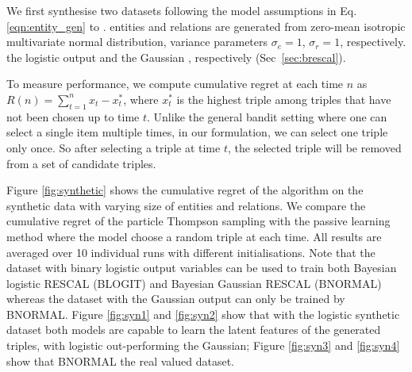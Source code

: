 We first synthesise two datasets 
following the model assumptions in Eq. \ref{eqn:entity_gen} to 
\verify{\ref{eqn:triple_gen}}. 
entities and relations are generated from zero-mean isotropic multivariate normal distribution,  
variance parameters $\sigma_e=1$, $\sigma_r=1$, respectively.
 the logistic output and the Gaussian , respectively (Sec~\ref{sec:brescal}). 

To measure performance, we compute cumulative regret 
at each time $n$ as $R(n) = \sum_{t=1}^{n} x_t - x^{*}_t$, 
where $x^*_t$ is the highest triple among triples that have not been chosen up to time $t$. Unlike the general 
bandit setting where one can select a single item multiple times, in our formulation, we can select one triple 
only once. So after selecting a triple at time $t$, the selected triple will be removed from a set of candidate 
triples.

Figure \ref{fig:synthetic} shows the cumulative regret of the algorithm on the synthetic data with varying size of 
entities and relations. We compare the cumulative regret of the particle Thompson sampling with the passive 
learning method where the model choose a random triple at each time. All results are averaged over 10 
individual runs with different initialisations. 
Note that the dataset with binary logistic output variables can be used to train both Bayesian logistic RESCAL (BLOGIT) and Bayesian Gaussian RESCAL (BNORMAL) whereas the dataset with the Gaussian output can only be trained by BNORMAL.
Figure \ref{fig:syn1} and \ref{fig:syn2} show that with the logistic synthetic dataset both models are capable to learn the latent features of the generated triples, with logistic out-performing the Gaussian; Figure \ref{fig:syn3} and \ref{fig:syn4} show that BNORMAL  the real valued dataset. 

